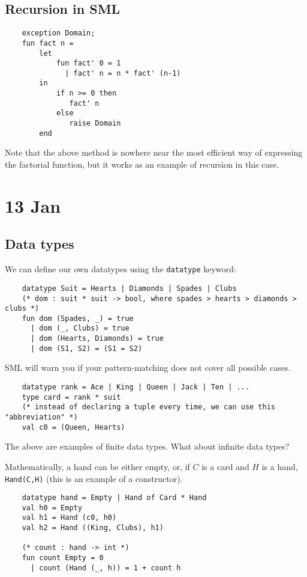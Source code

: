 \documentclass[11pt]{article}
\begin{document}
\subsection{Recursion in SML}
\begin{verbatim}
    exception Domain;
    fun fact n =
        let
            fun fact' 0 = 1
              | fact' n = n * fact' (n-1)
        in
            if n >= 0 then
               fact' n
            else
               raise Domain
        end
\end{verbatim}

Note that the above method is nowhere near the most efficient way of expressing the factorial function, but it works as an example of recursion in this case.

\section{13 Jan} %
\subsection{Data types}
We can define our own datatypes using the \verb!datatype! keyword:
\begin{verbatim}
    datatype Suit = Hearts | Diamonds | Spades | Clubs
    (* dom : suit * suit -> bool, where spades > hearts > diamonds > clubs *)
    fun dom (Spades, _) = true
      | dom (_, Clubs) = true
      | dom (Hearts, Diamonds) = true
      | dom (S1, S2) = (S1 = S2)
\end{verbatim}
SML will warn you if your pattern-matching does not cover all possible cases.

\begin{verbatim}
    datatype rank = Ace | King | Queen | Jack | Ten | ...
    type card = rank * suit     
    (* instead of declaring a tuple every time, we can use this "abbreviation" *)
    val c0 = (Queen, Hearts)
\end{verbatim}

The above are examples of finite data types. What about infinite data types?

Mathematically, a hand can be either empty, or, if $C$ is a card and $H$ is a hand, \verb!Hand(C,H)! (this is an example of a constructor).

\begin{verbatim}
    datatype hand = Empty | Hand of Card * Hand
    val h0 = Empty
    val h1 = Hand (c0, h0)
    val h2 = Hand ((King, Clubs), h1)
    
    (* count : hand -> int *)
    fun count Empty = 0
      | count (Hand (_, h)) = 1 + count h
\end{verbatim}
\end{document}
